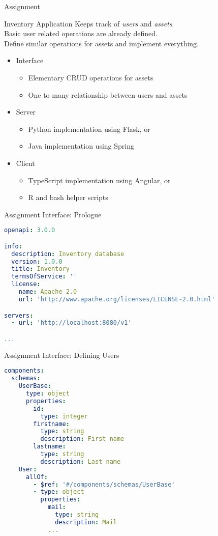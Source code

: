 \begin{frame}{Assignment}
    \begin{block}{Inventory Application}
        Keeps track of \emph{users} and \emph{assets}. \\
        Basic user related operations are already defined. \\
        Define similar operations for assets and implement everything.
    \end{block}

    \begin{itemize}
        \item Interface
        \begin{itemize}
            \item Elementary CRUD operations for assets
            \item One to many relationship between users and assets
        \end{itemize}
        \item Server
        \begin{itemize}
            \item Python implementation using Flask, or
            \item Java implementation using Spring
        \end{itemize}
        \item Client
        \begin{itemize}
            \item TypeScript implementation using Angular, or
            \item R and bash helper scripts
        \end{itemize}
    \end{itemize}
\end{frame}


\begin{frame}[fragile]{Assignment Interface: Prologue}
\begin{lstlisting}[language=yaml,style=mini]
openapi: 3.0.0

info:
  description: Inventory database
  version: 1.0.0
  title: Inventory
  termsOfService: ''
  license:
    name: Apache 2.0
    url: 'http://www.apache.org/licenses/LICENSE-2.0.html'

servers:
  - url: 'http://localhost:8080/v1'

...
\end{lstlisting}
\end{frame}


\begin{frame}[fragile]{Assignment Interface: Defining Users}
\begin{lstlisting}[language=yaml,style=mini]
components:
  schemas:
    UserBase:
      type: object
      properties:
        id:
          type: integer
        firstname:
          type: string
          description: First name
        lastname:
          type: string
          description: Last name
    User:
      allOf:
        - $ref: '#/components/schemas/UserBase'
        - type: object
          properties:
            mail:
              type: string
              description: Mail
            ...
\end{lstlisting}
\end{frame}


